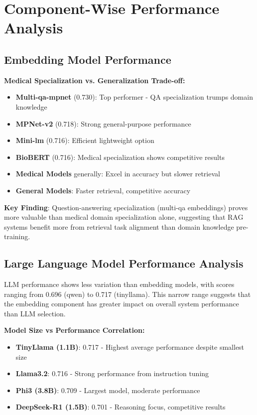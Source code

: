 \section{Component-Wise Performance Analysis}

\subsection{Embedding Model Performance}


\textbf{Medical Specialization vs. Generalization Trade-off:}
\begin{itemize}
    \item \textbf{Multi-qa-mpnet} (0.730): Top performer - QA specialization trumps domain knowledge
    \item \textbf{MPNet-v2} (0.718): Strong general-purpose performance
    \item \textbf{Mini-lm} (0.716): Efficient lightweight option
    \item \textbf{BioBERT} (0.716): Medical specialization shows competitive results
    \item \textbf{Medical Models} generally: Excel in accuracy but slower retrieval
    \item \textbf{General Models}: Faster retrieval, competitive accuracy
\end{itemize}

\textbf{Key Finding}: Question-answering specialization (multi-qa embeddings) proves more valuable than medical domain specialization alone, suggesting that RAG systems benefit more from retrieval task alignment than domain knowledge pre-training.

\subsection{Large Language Model Performance Analysis}

LLM performance shows less variation than embedding models, with scores ranging from 0.696 (qwen) to 0.717 (tinyllama). This narrow range suggests that the embedding component has greater impact on overall system performance than LLM selection.

\textbf{Model Size vs Performance Correlation:}
\begin{itemize}
    \item \textbf{TinyLlama (1.1B)}: 0.717 - Highest average performance despite smallest size
    \item \textbf{Llama3.2}: 0.716 - Strong performance from instruction tuning
    \item \textbf{Phi3 (3.8B)}: 0.709 - Largest model, moderate performance
    \item \textbf{DeepSeek-R1 (1.5B)}: 0.701 - Reasoning focus, competitive results
\end{itemize}

